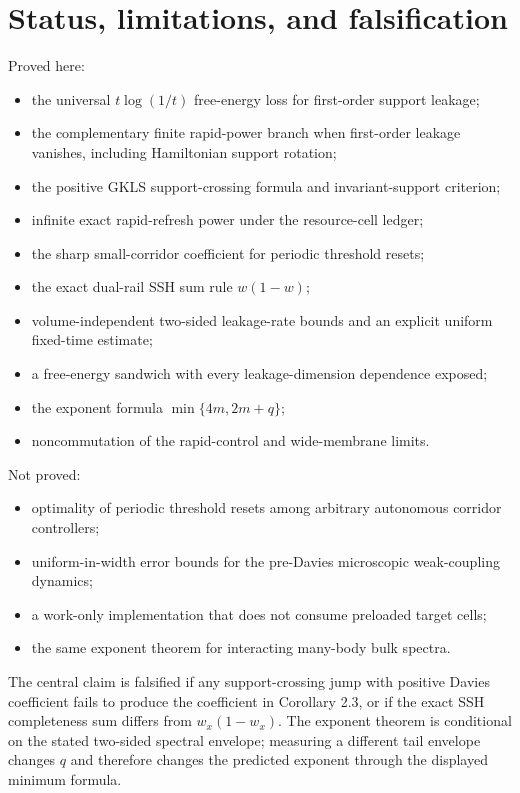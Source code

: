 \documentclass[11pt,a4paper]{article}
\theoremstyle{remark}
\begin{document}
\section{Status, limitations, and falsification}
Proved here:
\begin{itemize}
\item the universal $t \log(1/t)$ free-energy loss for first-order support leakage;
\item the complementary finite rapid-power branch when first-order leakage vanishes, including Hamiltonian support rotation;
\item the positive GKLS support-crossing formula and invariant-support criterion;
\item infinite exact rapid-refresh power under the resource-cell ledger;
\item the sharp small-corridor coefficient for periodic threshold resets;
\item the exact dual-rail SSH sum rule $w(1-w)$;
\item volume-independent two-sided leakage-rate bounds and an explicit uniform fixed-time estimate;
\item a free-energy sandwich with every leakage-dimension dependence exposed;
\item the exponent formula $\min\{4m,2m+q\}$;
\item noncommutation of the rapid-control and wide-membrane limits.
\end{itemize}
Not proved:
\begin{itemize}
\item optimality of periodic threshold resets among arbitrary autonomous corridor controllers;
\item uniform-in-width error bounds for the pre-Davies microscopic weak-coupling dynamics;
\item a work-only implementation that does not consume preloaded target cells;
\item the same exponent theorem for interacting many-body bulk spectra.
\end{itemize}
The central claim is falsified if any support-crossing jump with positive Davies coefficient fails to produce the coefficient in Corollary 2.3, or if the exact SSH completeness sum differs from $w_x(1-w_x)$. The exponent theorem is conditional on the stated two-sided spectral envelope; measuring a different tail envelope changes $q$ and therefore changes the predicted exponent through the displayed minimum formula.
\appendix
\end{document}
